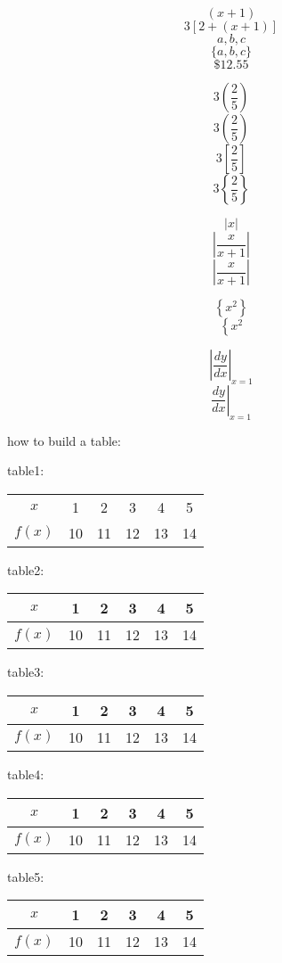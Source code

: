 \documentclass[11pt]{article}
\begin{document}
$$(x+1)$$
$$3[2+(x+1)]$$
$${a,b,c}$$
$$\{a,b,c\}$$
$$\$12.55$$

$$3(\frac{2}{5})$$
$$3\left(\frac{2}{5}\right)$$
$$3\left[\frac{2}{5}\right]$$
$$3\left\{\frac{2}{5}\right\}$$

$$|x|$$
$$|\frac{x}{x+1}|$$
$$\left|\frac{x}{x+1}\right|$$

$$\left\{x^2\right\}$$
$$\left\{x^2\right.$$

$$\left|\frac{dy}{dx}\right|_{x=1}$$
$$\left.\frac{dy}{dx}\right|_{x=1}$$

how to build a table:

table1:

\begin{tabular}{cccccc}

$x$ & 1 & 2 & 3 & 4 & 5 \\
$f(x)$ & 10 & 11 & 12 & 13 &14

\end{tabular}

table2:

\begin{tabular}{cccccc}

$x$ & 1 & 2 & 3 & 4 & 5 \\ \hline
$f(x)$ & 10 & 11 & 12 & 13 &14

\end{tabular}

table3:

\begin{tabular}{c|ccccc}

$x$ & 1 & 2 & 3 & 4 & 5 \\ \hline 
$f(x)$ & 10 & 11 & 12 & 13 &14

\end{tabular}

table4:

\begin{tabular}{c|c|c|c|c|c}

$x$ & 1 & 2 & 3 & 4 & 5 \\ \hline
$f(x)$ & 10 & 11 & 12 & 13 &14

\end{tabular}

table5:

\begin{tabular}{|c|c|c|c|c|c|}

$x$ & 1 & 2 & 3 & 4 & 5 \\ \hline
$f(x)$ & 10 & 11 & 12 & 13 &14

\end{tabular}
\end{document}
